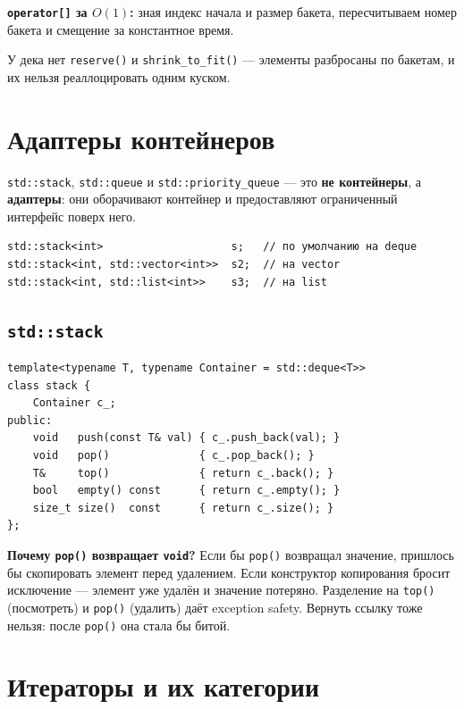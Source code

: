 \documentclass[a4paper,12pt]{article}
\begin{document}
\textbf{\texttt{operator[]} за $O(1)$:} зная индекс начала и размер бакета,
пересчитываем номер бакета и смещение за константное время.

\medskip
У дека нет \texttt{reserve()} и \texttt{shrink\_to\_fit()} --- элементы
разбросаны по бакетам, и их нельзя реаллоцировать одним куском.



\section{Адаптеры контейнеров}

\texttt{std::stack}, \texttt{std::queue} и \texttt{std::priority\_queue}
--- это \textbf{не контейнеры}, а \textbf{адаптеры}: они оборачивают
контейнер и предоставляют ограниченный интерфейс поверх него.

\begin{lstlisting}
std::stack<int>                    s;   // по умолчанию на deque
std::stack<int, std::vector<int>>  s2;  // на vector
std::stack<int, std::list<int>>    s3;  // на list
\end{lstlisting}

\subsection{\texttt{std::stack}}

\begin{lstlisting}
template<typename T, typename Container = std::deque<T>>
class stack {
    Container c_;
public:
    void   push(const T& val) { c_.push_back(val); }
    void   pop()              { c_.pop_back(); }
    T&     top()              { return c_.back(); }
    bool   empty() const      { return c_.empty(); }
    size_t size()  const      { return c_.size(); }
};
\end{lstlisting}

\textbf{Почему \texttt{pop()} возвращает \texttt{void}?}
Если бы \texttt{pop()} возвращал значение, пришлось бы скопировать
элемент перед удалением. Если конструктор копирования бросит исключение
--- элемент уже удалён и значение потеряно. Разделение на \texttt{top()}
(посмотреть) и \texttt{pop()} (удалить) даёт exception safety.
Вернуть ссылку тоже нельзя: после \texttt{pop()} она стала бы битой.

\newpage
\section{Итераторы и их категории}
\end{document}
